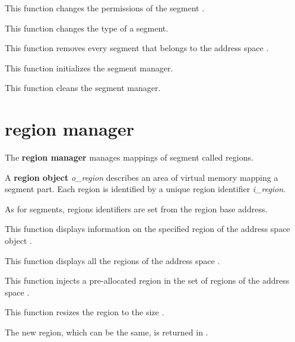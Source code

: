 	 {
	   This function changes the permissions of the segment .
	 }

	 {
	   This function changes the type of a segment.
	 }

	 {
	   This function removes every segment that belongs to the
	   address space .
	 }

	 {
	   This function initializes the segment manager.
	 }

	 {
	   This function cleans the segment manager.
	 }

%
%

\section{region manager}

The \textbf{region manager} manages mappings of segment called regions.

A \textbf{region object} \textit{o\_region} describes an area of virtual
memory mapping a segment part. Each region is identified by a unique region
identifier \textit{i\_region}.

As for segments, regions identifiers are set from the region base address.

	 {
	   This function displays information on the specified region
	    of the address space object .
	 }

	 {
	   This function displays all the regions of the address space
	   .
	 }

	 {
	   This function injects a pre-allocated region in the set of
	   regions of the address space .
	 }

	 {
	   This function resizes the region  to the
	   size .

	   The new region, which can be the same, is returned in
	   .
	 }


